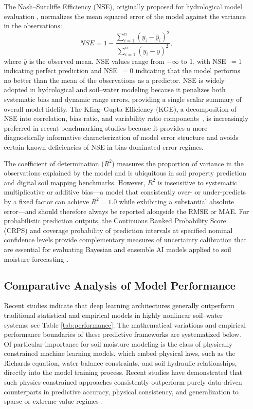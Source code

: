 \documentclass[land,review,accept,pdftex,oneauthor]{Definitions/mdpi}
\begin{document}
The Nash--Sutcliffe Efficiency (NSE), originally proposed for hydrological model evaluation \citep{nash1970river}, normalizes the mean squared error of the model against the variance in the observations:
\begin{equation}
NSE = 1 - \frac{\sum_{i=1}^{n}(y_i - \hat{y}_i)^2}{\sum_{i=1}^{n}(y_i - \bar{y})^2},
\end{equation}
where $\bar{y}$ is the observed mean. NSE values range from $-\infty$ to 1, with NSE~$= 1$ indicating perfect prediction and NSE~$= 0$ indicating that the model performs no better than the mean of the observations as a predictor. NSE is widely adopted in hydrological and soil--water modeling because it penalizes both systematic bias and dynamic range errors, providing a single scalar summary of overall model fidelity. The Kling--Gupta Efficiency (KGE), a decomposition of NSE into correlation, bias ratio, and variability ratio components~\citep{gupta2009decomposition}, is increasingly preferred in recent benchmarking studies because it provides a more diagnostically informative characterization of model error structure and avoids certain known deficiencies of NSE in bias-dominated error regimes.

The coefficient of determination ($R^2$) measures the proportion of variance in the observations explained by the model and is ubiquitous in soil property prediction and digital soil mapping benchmarks. However, $R^2$ is insensitive to systematic multiplicative or additive bias---a model that consistently over- or under-predicts by a fixed factor can achieve $R^2 = 1.0$ while exhibiting a substantial absolute error---and should therefore always be reported alongside the RMSE or MAE. For probabilistic prediction outputs, the Continuous Ranked Probability Score (CRPS) and coverage probability of prediction intervals at specified nominal confidence levels provide complementary measures of uncertainty calibration that are essential for evaluating Bayesian and ensemble AI models applied to soil moisture forecasting \citep{gneiting2007strictly}.

\subsection{Comparative Analysis of Model Performance}
Recent studies indicate that deep learning architectures generally outperform traditional statistical and empirical models in highly nonlinear soil--water systems; see Table \ref{tab:performance}. The mathematical variations and empirical performance boundaries of these predictive frameworks are systematized below. {Of particular importance for soil moisture modeling is the class of physically constrained machine learning models, which embed physical laws, such as the Richards equation, water balance constraints, and soil hydraulic relationships, directly into the model training process. Recent studies have demonstrated that such physics-constrained approaches consistently outperform purely data-driven counterparts in predictive accuracy, physical consistency, and generalization to sparse or extreme-value regimes \citep{ghorbani2021physics,Wang2023WR035194,Alsumaiei70551}.}
\end{document}
